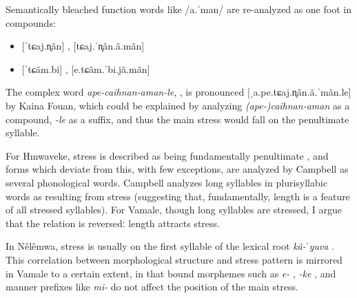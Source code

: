 Semantically bleached function words like /a.ˈman/  are re-analyzed as one foot in compounds: 
	
\begin{itemize}
	\item {[}ˈtɕaj.n̥ãn] , [tɕaj.ˈn̥ãn.ã.mãn] 
	\item {[}ˈtɕãm.bi] , [e.tɕãm.ˈbi.jã.mãn]  
\end{itemize}
	
The complex word \textit{ape-caihnan-aman-le},  , is pronounced {[ˌa.pe.tɕaj.n̥ãn.ã.ˈmãn.le]} by Kaina Fouan, which could be explained by analyzing \textit{(ape-)caihnan-aman}  as a compound, \textit{-le}  as a suffix, and thus the main stress would fall on the penultimate syllable.
	
	
For Hmwaveke, stress is described as being fundamentally penultimate \parencite[59]{campbell_phenomenon_1987}, and forms which deviate from this, with few exceptions, are analyzed by Campbell as several phonological words. Campbell analyzes long syllables in plurisyllabic words as resulting from stress (suggesting that, fundamentally, length is a feature of all stressed syllables). For Vamale, though long syllables are stressed, I argue that the relation is reversedː length attracts stress.
 
In Nêlêmwa, stress is usually on the first syllable of the lexical root \textit{kâ-ˈyuva}  \parencite[26]{bril_nelemwa_2002}. This correlation between morphological structure and stress pattern is mirrored in Vamale to a certain extent, in that bound morphemes such as \textit{e-} , \textit{-ke} , and manner prefixes like \textit{mi-}  do not affect the position of the main stress. %

